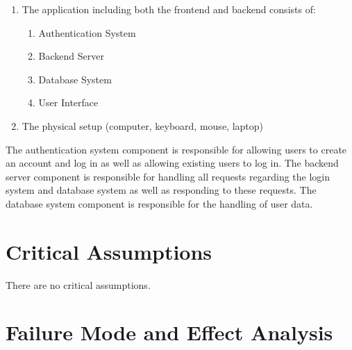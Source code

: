 \documentclass{article}
\begin{document}
\begin{enumerate}
    \item The application including both the frontend and backend consists of:
    \begin{enumerate}
        \item Authentication System
        \item Backend Server
        \item Database System
        \item User Interface
    \end{enumerate}
    \item The physical setup (computer, keyboard, mouse, laptop)
\end{enumerate}

The authentication system component is responsible for allowing users to create an account and log in as well as allowing existing users to log in. The backend server component is responsible for handling all requests regarding the login system and database system as well as responding to these requests. The database system component is responsible for the handling of user data.

\section{Critical Assumptions}
There are no critical assumptions. 

\section{Failure Mode and Effect Analysis}
\end{document}

